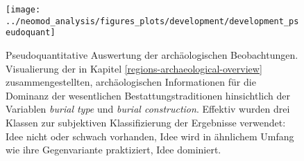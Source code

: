 \documentclass[openany,twoside,twocolumn]{book}
\begin{document}
\begin{figure}[!t]

{\centering \texttt{[image: ../neomod\_analysis/figures\_plots/development/development\_pseudoquant]} 

}

\caption[Pseudoquantitative Auswertung der archäologischen Beobachtungen]{Pseudoquantitative Auswertung der archäologischen Beobachtungen. Visualierung der in Kapitel \ref{regions-archaeological-overview} zusammengestellten, archäologischen Informationen für die Dominanz der wesentlichen Bestattungstraditionen hinsichtlich der Variablen \textit{burial type} und \textit{burial construction}. Effektiv wurden drei Klassen zur subjektiven Klassifizierung der Ergebnisse verwendet: Idee nicht oder schwach vorhanden, Idee wird in ähnlichem Umfang wie ihre Gegenvariante praktiziert, Idee dominiert.}\label{fig:development-proportions-regions-pseudoquant}
\end{figure}
\end{document}
